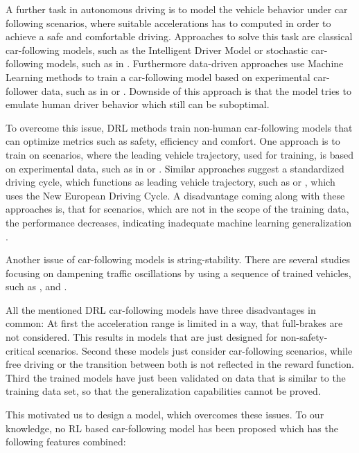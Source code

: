 \documentclass[review]{elsarticle}
\providecommand{\3}{{\ss}}
\begin{document}
A further task in autonomous driving is to model the vehicle behavior under car following scenarios, where suitable accelerations has to computed in order to achieve a safe and comfortable driving. Approaches to solve this task are classical car-following models, such as the Intelligent Driver Model \cite{Opus} or stochastic car-following models, such as in \cite{Treiber2018stochIDM_TRB}. Furthermore data-driven approaches use Machine Learning methods to train a car-following model based on experimental car-follower data, such as in \cite{Chong2011SimulationOD} or \cite{ZHOU2017245}. Downside of this approach is that the model tries to emulate human driver behavior which still can be suboptimal.

To overcome this issue, DRL methods train non-human car-following models that can optimize metrics such as safety, efficiency and comfort. 
One approach is to train on scenarios, where the leading vehicle trajectory, used for training, is based on experimental data, such as in \cite{SafeEfficientAndComfortable} or \cite{HumanLikeAutonomouCF}. Similar approaches suggest a standardized driving cycle, which functions as leading vehicle trajectory, such as \cite{ComparisonRLvsMPC} or \cite{CFelectricVehicle}, which uses the New European Driving Cycle.
A disadvantage coming along with these approaches is, that for scenarios, which are not in the scope of the training data, the performance decreases, indicating inadequate machine learning generalization \cite{ComparisonRLvsMPC}. 

Another issue of car-following models is string-stability. There are several studies focusing on dampening traffic oscillations by using a sequence of trained vehicles, such as \cite{qu2020jointly}, \cite{DissipatingStopAndGoWaves} and \cite{DampenStopAndGoTraffic}.

All the mentioned DRL car-following models have three disadvantages in common: At first the acceleration range is limited in a way, that full-brakes are not considered. This results in models that are just designed for non-safety-critical scenarios. Second these models just consider car-following scenarios, while free driving or the transition between both is not reflected in the reward function. Third the trained models have just been validated on data that is similar to the training data set, so that the generalization capabilities cannot be proved. 

This motivated us to design a model, which overcomes these issues.
To our knowledge, no RL based car-following model has been proposed which has the following features combined:
\end{document}
